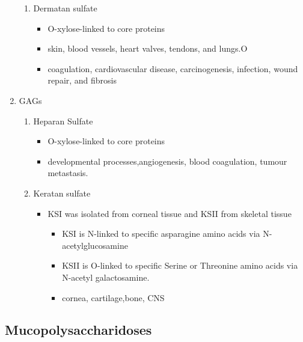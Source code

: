 \documentclass{scrartcl}
\begin{document}
\begin{enumerate}
\begin{enumerate}
\item Dermatan sulfate
\label{sec:org896b4bf}
\begin{itemize}
\item O-xylose-linked to core proteins
\item skin, blood vessels, heart valves, tendons, and lungs.O
\item coagulation, cardiovascular disease, carcinogenesis, infection, wound repair, and fibrosis
\end{itemize}
\end{enumerate}

\item GAGs
\label{sec:org3a0c9c5}

\begin{enumerate}
\item Heparan Sulfate
\label{sec:org8ee86ad}
\begin{itemize}
\item O-xylose-linked to core proteins
\item developmental processes,angiogenesis, blood coagulation, tumour metastasis.
\end{itemize}

\item Keratan sulfate
\label{sec:org2a691d6}
\begin{itemize}
\item KSI was isolated from corneal tissue and KSII from skeletal tissue
\begin{itemize}
\item KSI is N-linked to specific asparagine amino acids via
N-acetylglucosamine
\item KSII is O-linked to specific Serine or Threonine amino acids via
N-acetyl galactosamine.
\item cornea, cartilage,bone, CNS
\end{itemize}
\end{itemize}
\end{enumerate}
\end{enumerate}


\subsection{Mucopolysaccharidoses}
\label{sec:org6da3c87}
\end{document}
